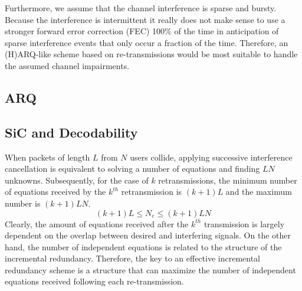 Furthermore, we assume that the channel interference is sparse and bursty. Because the interference is intermittent it really does not make sense to use a stronger forward error correction (FEC) 100\% of the time in anticipation of sparse interference events that only occur a fraction of the time. Therefore, an (H)ARQ-like scheme based on re-transmissions would be most suitable to handle the assumed channel impairments.

\subsection{ARQ}
\label{sec: arq}



\subsection{SiC and Decodability}
\label{sec:sic_equations}
When packets of length $L$ from $N$ users collide, applying successive interference cancellation is equivalent to solving a number of equations and finding $LN$ unknowns. Subsequently, for the case of $k$ retransmissions, the minimum number of equations received by the $k^{th}$ retransmission is $(k+1)L$ and the maximum number is $(k+1)LN$.
\begin{equation}
\label{eq:numeq}
(k+1)L \leq N_e \leq (k+1)LN
\end{equation}
Clearly, the amount of equations received after the $k^{th}$ transmission is largely dependent on the overlap between desired and interfering signals. On the other hand, the number of independent equations is related to the structure of the incremental redundancy. Therefore, the key to an effective incremental redundancy scheme is a structure that can maximize the number of independent equations received following each re-transmission.

